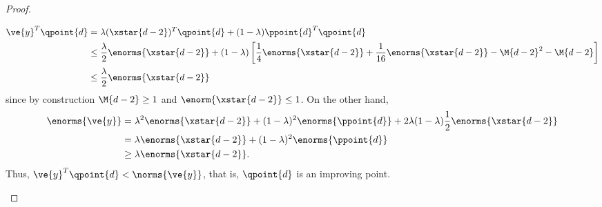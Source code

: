 \begin{proof}
\begin{claimproof}
\begin{align*}
 \ve{y}^T\qpoint{d} 
 &= \lambda(\xstar{d-2})^T\qpoint{d} + (1-\lambda) \ppoint{d}^T\qpoint{d} \\
 &\leq \frac{\lambda}{2} \enorms{\xstar{d-2}} + (1-\lambda)\left[\frac{1}{4} \enorms{\xstar{d-2}} + \frac{1}{16}\enorms{\xstar{d-2}} -\M{d-2}^2-\M{d-2}\right] \\
 &\leq \frac{\lambda}{2} \enorms{\xstar{d-2}} 
\end{align*}
since by construction $\M{d-2} \geq 1$ and $\enorm{\xstar{d-2}} \leq 1$.
On the other hand,
\begin{align*}
\enorms{\ve{y}} 
&= \lambda^2 \enorms{\xstar{d-2}} + 
(1-\lambda)^2 \enorms{\ppoint{d}} +
2\lambda(1-\lambda)\frac{1}{2}\enorms{\xstar{d-2}} \\
&= \lambda \enorms{\xstar{d-2}} + 
(1-\lambda)^2 \enorms{\ppoint{d}} \\
&\geq \lambda \enorms{\xstar{d-2}}.
\end{align*}
Thus, $\ve{y}^T\qpoint{d} < \norms{\ve{y}}$, that is, $\qpoint{d}$ is an improving point.
%
\end{claimproof}







\end{proof}
